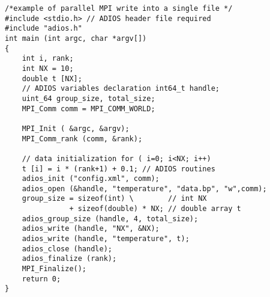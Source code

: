 \begin{lstlisting}[alsolanguage=C,caption={ADIOS programming example.},label={list-adios-prog-example}]
/*example of parallel MPI write into a single file */ 
#include <stdio.h> // ADIOS header file required 
#include "adios.h"
int main (int argc, char *argv[])
{    
    int i, rank; 
    int NX = 10;
    double t [NX];
    // ADIOS variables declaration int64_t handle;
    uint_64 group_size, total_size;
    MPI_Comm comm = MPI_COMM_WORLD; 
    
    MPI_Init ( &argc, &argv);
    MPI_Comm_rank (comm, &rank);

    // data initialization for ( i=0; i<NX; i++)
    t [i] = i * (rank+1) + 0.1; // ADIOS routines 
    adios_init ("config.xml", comm);
    adios_open (&handle, "temperature", "data.bp", "w",comm); 
    group_size = sizeof(int) \        // int NX
               + sizeof(double) * NX; // double array t
    adios_group_size (handle, 4, total_size);
    adios_write (handle, "NX", &NX);
    adios_write (handle, "temperature", t); 
    adios_close (handle);
    adios_finalize (rank);
    MPI_Finalize(); 
    return 0;
}
\end{lstlisting}
